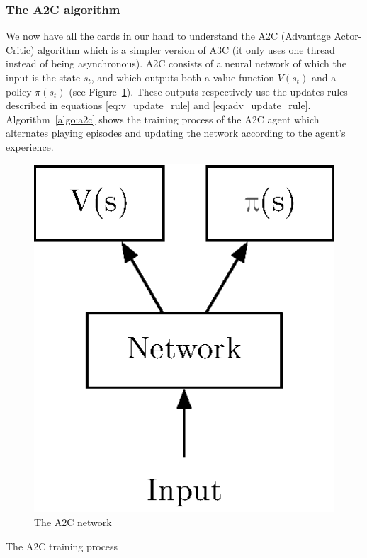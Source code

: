 \subsubsection{The A2C algorithm}
We now have all the cards in our hand to understand the A2C
(Advantage Actor-Critic) algorithm which is a simpler version of A3C \cite{a3c}
(it only uses one thread instead of being asynchronous). 
A2C consists of a neural network
of which the input is the state $s_t$, and which outputs both a value function
$V(s_t)$ and a policy $\pi(s_t)$ (see Figure~\ref{fig:a2c}). These outputs
respectively use the updates rules described in equations \ref{eq:v_update_rule}
and \ref{eq:adv_update_rule}.  
Algorithm~\ref{algo:a2c} shows the training
process of the A2C agent which alternates playing episodes and updating the
network according to the agent's experience.

\begin{figure}[]
	\centering
	\includegraphics[width=0.2\linewidth]{fig/a3c.eps}
	\caption{The A2C network}
	\label{fig:a2c}
\end{figure}

\begin{algorithm}
\caption{The A2C training process}
\label{algo:a2c}
\begin{algorithmic}[1]
	\Statex
	\EndWhile
	\Statex
	\EndFor
	\Statex
\EndWhile

\end{algorithmic}
\end{algorithm}


